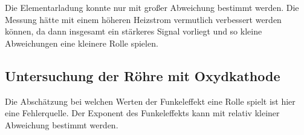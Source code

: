 Die Elementarladung konnte nur mit großer Abweichung bestimmt werden. Die Messung hätte mit einem höheren Heizstrom vermutlich verbessert werden können, da dann insgesamt ein stärkeres Signal vorliegt und so kleine Abweichungen eine kleinere Rolle spielen.

\subsection{Untersuchung der Röhre mit Oxydkathode}

Die Abschätzung bei welchen Werten der Funkeleffekt eine Rolle spielt ist hier eine Fehlerquelle. Der Exponent des Funkeleffekts kann mit relativ kleiner Abweichung bestimmt werden.
